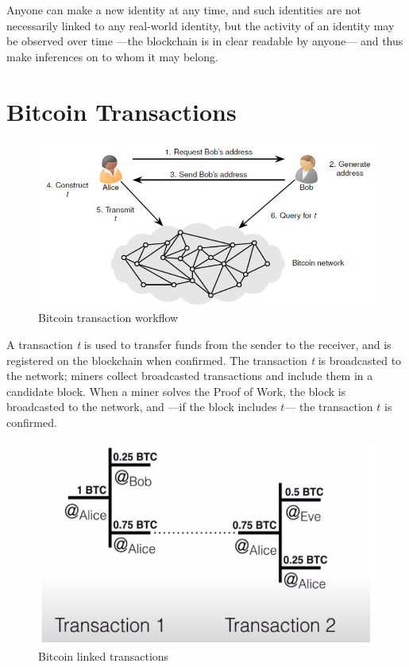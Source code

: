 Anyone can make a new identity at any time, and such identities are not necessarily linked to any real-world identity, but the activity of an identity may be observed over time ---the blockchain is in clear readable by anyone--- and thus make inferences on to whom it may belong.

\section{Bitcoin Transactions}

\begin{figure}[htbp]
   \centering
   \includegraphics{images/bitcoin_workflow.png}
   \caption{Bitcoin transaction workflow}
   \label{fig:bitcoin_workflow}
\end{figure}

A transaction \textit{t} is used to transfer funds from the sender to the receiver, and is registered on the blockchain when confirmed.
The transaction \textit{t} is broadcasted to the network; miners collect broadcasted transactions and include them in a candidate block.
When a miner solves the Proof of Work, the block is broadcasted to the network, and ---if the block includes $t$--- the transaction $t$ is confirmed.

\begin{figure}[htbp]
   \centering
   \includegraphics{images/bitcoin_transaction.png}
   \caption{Bitcoin linked transactions}
   \label{fig:bitcoin_transaction}
\end{figure}


